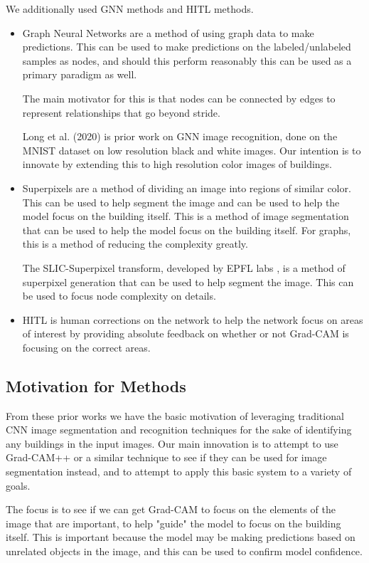 \documentclass{article}
\begin{document}
We additionally used GNN methods and HITL methods. \begin{itemize}
    \item Graph Neural Networks are a method of using graph data to make predictions. This can be used to make predictions on the labeled/unlabeled samples as nodes, and should this perform reasonably this can be used as a primary paradigm as well. 
    
    The main motivator for this is that nodes can be connected by edges to represent relationships that go beyond stride.

    Long et al.\cite{long} (2020) is prior work on GNN image recognition, done on the MNIST dataset on low resolution black and white images. Our intention is to innovate by extending this to high resolution color images of buildings.

    \item Superpixels are a method of dividing an image into regions of similar color. This can be used to help segment the image and can be used to help the model focus on the building itself. This is a method of image segmentation that can be used to help the model focus on the building itself. For graphs, this is a method of reducing the complexity greatly. 

    The SLIC-Superpixel transform, developed by EPFL labs \cite{epflSLICSuperpixels}, is a method of superpixel generation that can be used to help segment the image. This can be used to focus node complexity on details.
    \item HITL is human corrections on the network to help the network focus on areas of interest by providing absolute feedback on whether or not Grad-CAM is focusing on the correct areas.
\end{itemize}

\subsection{Motivation for Methods}

From these prior works we have the basic motivation of leveraging traditional CNN image segmentation and recognition techniques for the sake of identifying any buildings in the input images. Our main innovation is to attempt to use Grad-CAM++ or a similar technique to see if they can be used for image segmentation instead, and to attempt to apply this basic system to a variety of goals.

The focus is to see if we can get Grad-CAM to focus on the elements of the image that are important, to help "guide" the model to focus on the building itself. This is important because the model may be making predictions based on unrelated objects in the image, and this can be used to confirm model confidence.
\end{document}
